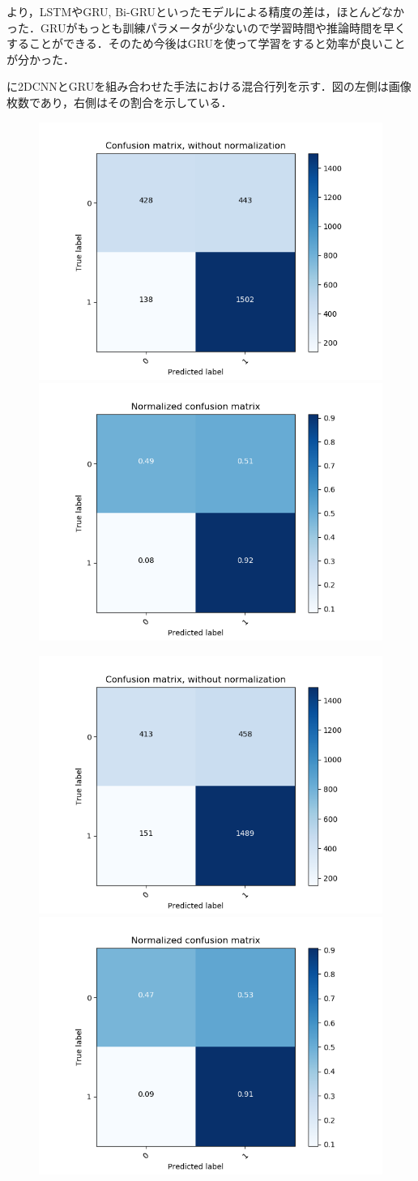 より，LSTMやGRU, Bi-GRUといったモデルによる精度の差は，ほとんどなかった．GRUがもっとも訓練パラメータが少ないので学習時間や推論時間を早くすることができる．そのため今後はGRUを使って学習をすると効率が良いことが分かった．

に2DCNNとGRUを組み合わせた手法における混合行列を示す．図の左側は画像枚数であり，右側はその割合を示している．

\begin{figure}[H]
	\centering
	\begin{minipage}[b]{\columnwidth}
		\centering
		\includegraphics[clip, width=0.45\linewidth]{fig/chapter4/3d/confusion_matrix/count_confusion_matrix_False_10_gru}
		\includegraphics[clip, width=0.45\linewidth]{fig/chapter4/3d/confusion_matrix/normalized_confusion_matrix_False_10_gru}
		\label{fig:}
	\end{minipage}

	\begin{minipage}[b]{\columnwidth}
		\centering
		\includegraphics[clip, width=0.45\linewidth]{fig/chapter4/3d/confusion_matrix/count_confusion_matrix_False_50_gru}
		\includegraphics[clip, width=0.45\linewidth]{fig/chapter4/3d/confusion_matrix/normalized_confusion_matrix_False_50_gru}
		\label{fig:}
	\end{minipage}


\end{figure}
